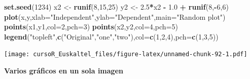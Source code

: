 \documentclass[]{book}
\newenvironment{Shaded}{\begin{snugshade}}{\end{snugshade}}
\newcommand{\KeywordTok}[1]{\textcolor[rgb]{0.13,0.29,0.53}{\textbf{#1}}}
\newcommand{\DataTypeTok}[1]{\textcolor[rgb]{0.13,0.29,0.53}{#1}}
\newcommand{\DecValTok}[1]{\textcolor[rgb]{0.00,0.00,0.81}{#1}}
\newcommand{\FloatTok}[1]{\textcolor[rgb]{0.00,0.00,0.81}{#1}}
\newcommand{\StringTok}[1]{\textcolor[rgb]{0.31,0.60,0.02}{#1}}
\newcommand{\OperatorTok}[1]{\textcolor[rgb]{0.81,0.36,0.00}{\textbf{#1}}}
\newcommand{\NormalTok}[1]{#1}
\begin{document}
\begin{Shaded}
\begin{Highlighting}[]
\KeywordTok{set.seed}\NormalTok{(}\DecValTok{1234}\NormalTok{)}
\NormalTok{x2 <-}\StringTok{ }\KeywordTok{runif}\NormalTok{(}\DecValTok{8}\NormalTok{,}\DecValTok{15}\NormalTok{,}\DecValTok{25}\NormalTok{)}
\NormalTok{y2 <-}\StringTok{ }\FloatTok{2.5}\OperatorTok{*}\NormalTok{x2 }\OperatorTok{-}\StringTok{ }\FloatTok{1.0} \OperatorTok{+}\StringTok{ }\KeywordTok{runif}\NormalTok{(}\DecValTok{8}\NormalTok{,}\OperatorTok{-}\DecValTok{6}\NormalTok{,}\DecValTok{6}\NormalTok{)}
 \KeywordTok{plot}\NormalTok{(x,y,}\DataTypeTok{xlab=}\StringTok{"Independent"}\NormalTok{,}\DataTypeTok{ylab=}\StringTok{"Dependent"}\NormalTok{,}\DataTypeTok{main=}\StringTok{"Random plot"}\NormalTok{)}
 \KeywordTok{points}\NormalTok{(x1,y1,}\DataTypeTok{col=}\DecValTok{2}\NormalTok{,}\DataTypeTok{pch=}\DecValTok{3}\NormalTok{)}
 \KeywordTok{points}\NormalTok{(x2,y2,}\DataTypeTok{col=}\DecValTok{4}\NormalTok{,}\DataTypeTok{pch=}\DecValTok{5}\NormalTok{)}
 \KeywordTok{legend}\NormalTok{(}\StringTok{"topleft"}\NormalTok{,}\KeywordTok{c}\NormalTok{(}\StringTok{"Original"}\NormalTok{,}\StringTok{"one"}\NormalTok{,}\StringTok{"two"}\NormalTok{),}\DataTypeTok{col=}\KeywordTok{c}\NormalTok{(}\DecValTok{1}\NormalTok{,}\DecValTok{2}\NormalTok{,}\DecValTok{4}\NormalTok{),}\DataTypeTok{pch=}\KeywordTok{c}\NormalTok{(}\DecValTok{1}\NormalTok{,}\DecValTok{3}\NormalTok{,}\DecValTok{5}\NormalTok{))}
\end{Highlighting}
\end{Shaded}

\texttt{[image: cursoR\_Euskaltel\_files/figure-latex/unnamed-chunk-92-1.pdf]}

\textbf{Varios gráficos en un sola imagen}
\end{document}
